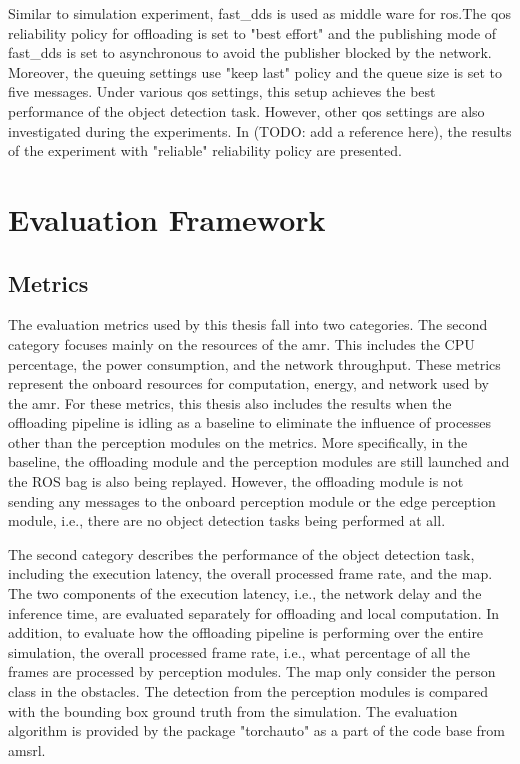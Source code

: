 Similar to simulation experiment, \gls{fast_dds} is used as middle ware for \gls{ros}.The \gls{qos} reliability policy for offloading is set to "best effort" and the publishing mode of \gls{fast_dds} is set to asynchronous to avoid the publisher blocked by the network. Moreover, the queuing settings use "keep last" policy and the queue size is set to five messages. Under various \gls{qos} settings, this setup achieves the best performance of the object detection task. However, other \gls{qos} settings are also investigated during the experiments. In (TODO: add a reference here), the results of the experiment with "reliable" reliability policy are presented. 


\section{Evaluation Framework}

\subsection{Metrics}


The evaluation metrics used by this thesis fall into two categories. The second category focuses mainly on the resources of the \gls{amr}. This includes the CPU percentage, the power consumption, and the network throughput. These metrics represent the onboard resources for computation, energy, and network used by the \gls{amr}. For these metrics, this thesis also includes the results when the offloading pipeline is idling as a baseline to eliminate the influence of processes other than the perception modules on the metrics. More specifically, in the baseline, the offloading module and the perception modules are still launched and the ROS bag is also being replayed. However, the offloading module is not sending any messages to the onboard perception module or the edge perception module, i.e., there are no object detection tasks being performed at all. 

The second category describes the performance of the object detection task, including the execution latency, the overall processed frame rate, and the \gls{map}. The two components of the execution latency, i.e., the network delay and the inference time, are evaluated separately for offloading and local computation. In addition, to evaluate how the offloading pipeline is performing over the entire simulation, the overall processed frame rate, i.e., what percentage of all the frames are processed by perception modules. The \gls{map} only consider the person class in the obstacles. The detection from the perception modules is compared with the bounding box ground truth from the simulation. The evaluation algorithm is provided by the package "torchauto" as a part of the code base from \gls{amsrl}. 

